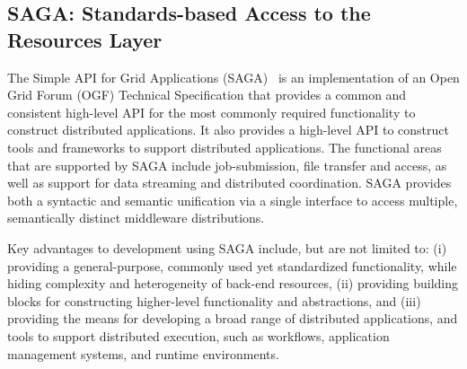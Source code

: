 \documentclass[]{svjour3}
\begin{document}
\subsection{SAGA: Standards-based Access to the Resources Layer}


 The Simple API for Grid Applications
(SAGA)~\cite{saga_url} is an implementation of an Open Grid Forum
(OGF) Technical Specification that provides a common and consistent
high-level API for the most commonly required functionality to
construct distributed applications. It also provides a high-level API
to construct tools and frameworks to support distributed
applications. The functional areas that are supported by SAGA include
job-submission, file transfer and access, as well as support for data
streaming and distributed coordination. SAGA provides both a syntactic
and semantic unification via a single interface to access multiple,
semantically distinct middleware distributions.

Key advantages to development using SAGA include, but are not limited to:
(i) providing a general-purpose, commonly used yet standardized functionality, while
hiding complexity and heterogeneity of back-end resources, (ii)
providing building blocks for constructing higher-level functionality
and abstractions, and (iii) providing the means for developing a broad
range of distributed applications, and tools to support distributed
execution, such as workflows, application management systems, and runtime environments.
\end{document}
